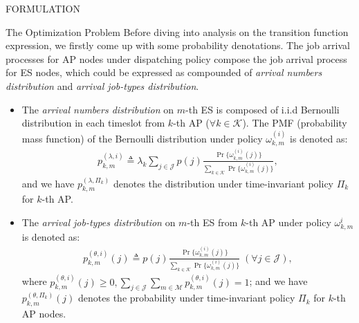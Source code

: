 \documentclass[10pt, conference, letterpaper]{IEEEtran}
\newcommand{\define}{\triangleq}
\renewcommand{\vec}{\mathbf}
\newcommand{\apSet}{\mathcal{K}}
\newcommand{\esSet}{\mathcal{M}}
\newcommand{\jSpace}{\mathcal{J}}
\begin{document}
\begin{section}{FORMULATION}
\begin{subsection}{The Optimization Problem}
            Before diving into analysis on the transition function expression, we firstly come up with some probability denotations.
            The job arrival processes for AP nodes under dispatching policy compose the job arrival process for ES nodes, which could be expressed as compounded of \emph{arrival numbers distribution} and \emph{arrival job-types distribution}.
            \begin{itemize}
                \item
                    The \emph{arrival numbers distribution} on $m$-th ES is composed of i.i.d Bernoulli distribution in each timeslot from $k$-th AP ($\forall k\in\apSet$). The PMF (probability mass function) of the Bernoulli distribution under policy $\omega^{(i)}_{k,m}$ is denoted as:
                    \begin{align}
                        p^{(\lambda,i)}_{k,m} \define \lambda_k \sum_{j\in\jSpace} p(j)
                            \frac{
                                \Pr\{\omega^{(i)}_{k,m}(j)\}
                            }{
                                \sum_{k\in\apSet} \Pr\{\omega^{(i)}_{k,m}(j)\}
                            },
                    \end{align}
                    and we have $p^{(\lambda,\Pi_k)}_{k,m}$ denotes the distribution under time-invariant policy $\Pi_{k}$ for $k$-th AP.
                \item
                    The \emph{arrival job-types distribution} on $m$-th ES from $k$-th AP under policy $\omega^{i}_{k,m}$ is denoted as:
                    \begin{align}
                        p^{(\theta, i)}_{k,m}(j) \define p(j)
                            \frac{
                                \Pr\{\omega^{(i)}_{k,m}(j)\}
                            }{
                                \sum_{k\in\apSet} \Pr\{\omega^{(i)}_{k,m}(j)\}
                            }\;(\forall j\in\jSpace),
                    \end{align}
                    where $p^{(\theta, i)}_{k,m}(j) \geq 0, \sum_{j\in\jSpace}\sum_{m\in\esSet} p^{(\theta, i)}_{k,m}(j)=1$; and we have $p^{(\theta,\Pi_k)}_{k,m}(j)$ denotes the probability under time-invariant policy $\Pi_k$ for $k$-th AP nodes.
            \end{itemize}
            

\end{subsection}
\end{section}
\end{document}
